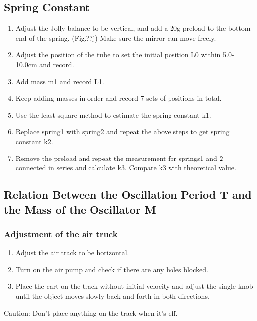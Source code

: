 \documentclass[12pt,a4paper]{article}
\begin{document}
\subsection{Spring Constant}
\begin{enumerate}[1.]
    \item Adjust the Jolly balance to be vertical, and add a 20g preload to the bottom end of the spring. (Fig.??j) Make sure the mirror can move freely.
    \item Adjust the position of the tube to set the initial position L0 within 5.0-10.0cm and record.
    \item Add mass m1 and record L1. 
    \item Keep adding masses in order and record 7 sets of positions in total. 
    \item Use the least square method to estimate the spring constant k1.
    \item Replace spring1 with spring2 and repeat the above steps to get spring constant k2.\item Remove the preload and repeat the measurement for springs1 and 2 connected in series and calculate k3. Compare k3 with theoretical value.
\end{enumerate}

\subsection{Relation Between the Oscillation Period T and the Mass of the Oscillator M}
\subsubsection{Adjustment of the air truck}
\begin{enumerate}[1.]
    \item Adjust the air track to be horizontal. 
    \item Turn on the air pump and check if there are any holes blocked.
    \item Place the cart on the track without initial velocity and adjust the single knob until the object moves slowly back and forth in both directions.
\end{enumerate}
Caution: Don’t place anything on the track when it’s off.
\end{document}
